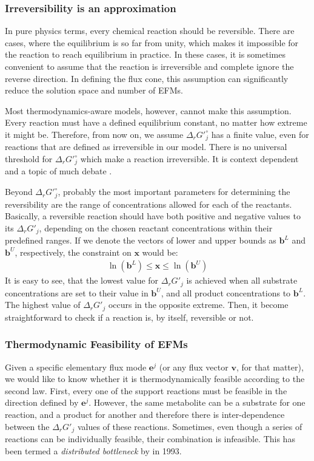 \documentclass[10pt,a4paper]{article}
\newcommand{\myvector}[1]{{\boldsymbol{#1}}}
\begin{document}
\subsubsection{Irreversibility is an approximation}
In pure physics terms, every chemical reaction should be reversible. There are cases, where the equilibrium is so far from unity, which makes it impossible for the reaction to reach equilibrium in practice. In these cases, it is sometimes convenient to assume that the reaction is irreversible and complete ignore the reverse direction. In defining the flux cone, this assumption can significantly reduce the solution space and number of EFMs.

Most thermodynamics-aware models, however, cannot make this assumption. Every reaction must have a defined equilibrium constant, no matter how extreme it might be. Therefore, from now on, we assume $\Delta_r G'^\circ_j$ has a finite value, even for reactions that are defined as irreversible in our model. There is no universal threshold for $\Delta_r G'^\circ_j$ which make a reaction irreversible. It is context dependent and a topic of much debate \cite{mavrovouniotis_identification_1993-1, henry_thermodynamics-based_2007, noor_integrated_2012}. 

Beyond $\Delta_r G'^\circ_j$, probably the most important parameters for determining the reversibility are the range of concentrations allowed for each of the reactants. Basically, a reversible reaction should have both positive and negative values to its $\Delta_r G'_j$, depending on the chosen reactant concentrations within their predefined ranges. If we denote the vectors of lower and upper bounds as $\myvector{b}^L$ and $\myvector{b}^U$, respectively, the constraint on $\myvector{x}$ would be:
\begin{eqnarray}
\ln(\myvector{b}^L) \leq \myvector{x} \leq \ln(\myvector{b}^U)
\end{eqnarray}
It is easy to see, that the lowest value for $\Delta_r G'_j$ is achieved when all substrate concentrations are set to their value in $\myvector{b}^U$, and all product concentrations to $\myvector{b}^L$. The highest value of $\Delta_r G'_j$ occurs in the opposite extreme. Then, it become straightforward to check if a reaction is, by itself, reversible or not.

\subsubsection{Thermodynamic Feasibility of EFMs}
Given a specific elementary flux mode $\myvector{e}^j$ (or any flux vector $\myvector{v}$, for that matter), we would like to know whether it is thermodynamically feasible according to the second law. First, every one of the support reactions must be feasible in the direction defined by $\myvector{e}^j$. However, the same metabolite can be a substrate for one reaction, and a product for another and therefore there is inter-dependence between the $\Delta_r G'_j$ values of these reactions. Sometimes, even though a series of reactions can be individually feasible, their combination is infeasible. This has been termed a \textit{distributed bottleneck} by \textcite{mavrovouniotis_identification_1993-1} in 1993.
\end{document}
